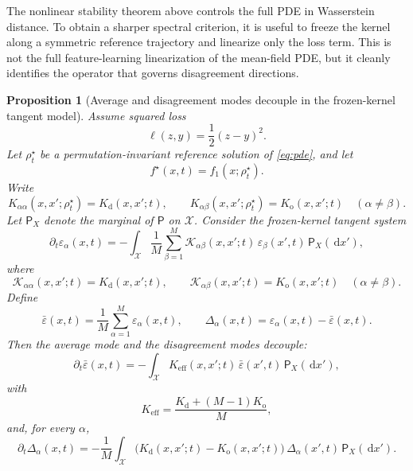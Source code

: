 \documentclass[11pt]{article}
\newtheorem{proposition}[theorem]{Proposition}
\theoremstyle{definition}
\newcommand{\dd}{\,\mathrm{d}}
\begin{document}
The nonlinear stability theorem above controls the full PDE in Wasserstein distance.
To obtain a sharper spectral criterion, it is useful to freeze the kernel along a symmetric reference trajectory
and linearize only the loss term.
This is not the full feature-learning linearization of the mean-field PDE,
but it cleanly identifies the operator that governs disagreement directions.

\begin{proposition}[Average and disagreement modes decouple in the frozen-kernel tangent model]
\label{prop:frozen-tangent}
Assume squared loss
\[
  \ell(z,y)=\frac12 (z-y)^2.
\]
Let $\rho_t^\star$ be a permutation-invariant reference solution of \eqref{eq:pde},
and let
\[
  f^\star(x,t)=f_1(x;\rho_t^\star).
\]
Write
\[
  K_{\alpha\alpha}(x,x';\rho_t^\star)=K_{\mathrm d}(x,x';t),
  \qquad
  K_{\alpha\beta}(x,x';\rho_t^\star)=K_{\mathrm o}(x,x';t)
  \quad (\alpha\neq\beta).
\]
Let $\mathsf P_X$ denote the marginal of $\mathsf P$ on $\mathcal X$.
Consider the frozen-kernel tangent system
\begin{equation}
  \partial_t \varepsilon_\alpha(x,t)
  =
  -
  \int_{\mathcal X}
  \frac1M \sum_{\beta=1}^M
  \mathcal K_{\alpha\beta}(x,x';t)\,
  \varepsilon_\beta(x',t)\,
  \mathsf P_X(\dd x'),
  \label{eq:frozen-tangent}
\end{equation}
where
\[
  \mathcal K_{\alpha\alpha}(x,x';t)=K_{\mathrm d}(x,x';t),
  \qquad
  \mathcal K_{\alpha\beta}(x,x';t)=K_{\mathrm o}(x,x';t)
  \quad (\alpha\neq\beta).
\]
Define
\[
  \bar \varepsilon(x,t)=\frac1M \sum_{\alpha=1}^M \varepsilon_\alpha(x,t),
  \qquad
  \Delta_\alpha(x,t)=\varepsilon_\alpha(x,t)-\bar \varepsilon(x,t).
\]
Then the average mode and the disagreement modes decouple:
\begin{equation}
  \partial_t \bar \varepsilon(x,t)
  =
  -
  \int_{\mathcal X}
  K_{\mathrm{eff}}(x,x';t)\,
  \bar \varepsilon(x',t)\,
  \mathsf P_X(\dd x'),
  \label{eq:avg-tangent}
\end{equation}
with
\[
  K_{\mathrm{eff}}=\frac{K_{\mathrm d}+(M-1)K_{\mathrm o}}{M},
\]
and, for every $\alpha$,
\begin{equation}
  \partial_t \Delta_\alpha(x,t)
  =
  -
  \frac1M
  \int_{\mathcal X}
  \bigl(
    K_{\mathrm d}(x,x';t)-K_{\mathrm o}(x,x';t)
  \bigr)\,
  \Delta_\alpha(x',t)\,
  \mathsf P_X(\dd x').
  \label{eq:disc-tangent}
\end{equation}
\end{proposition}
\end{document}
